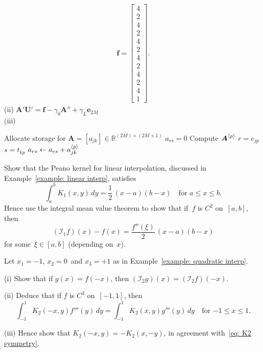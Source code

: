 \begin{Exercises}
\begin{ans}
\begin{gather*}
\boldsymbol{f}=\left[\begin{array}{c}
4\\ 2\\ 4\\ 2\\ 4\\ 2\\ 4\\ 2\\ 4\\ 2\\ 4\\ 1
\end{array}\right].
\end{gather*}
(ii) $\boldsymbol{A}'\boldsymbol{U}'=\boldsymbol{f}-\gamma_0\boldsymbol{A}''
+\gamma_L\boldsymbol{e}_{2M}$\\
(iii)
\begin{algorithmic}
\State Allocate storage for 
$\boldsymbol{A}=[a_{jk}]\in\mathbb{R}^{(2M)\times(2M+1)}$ 
        \State $a_{rs}=0$ 
    \EndFor
\EndFor
{}
    \State Compute $\boldsymbol{A}^{\langle p\rangle}$ 
        \State $r=e_{jp}$
                \State $s=t_{kp}$
                \State $a_{rs}\gets a_{rs}+a^{\langle p\rangle}_{jk}$
            \EndFor
        \EndIf
    \EndFor
\EndFor
\end{algorithmic}
\end{ans}

\exercise
Show that the Peano kernel for linear interpolation, discussed in 
Example~\ref{example: linear interp}, satisfies
\[
\int_a^b K_1(x,y)\,dy=\frac{1}{2}\,(x-a)(b-x)\quad\text{for $a\le x\le b$.}
\]
Hence use the integral mean value theorem to show that if~$f$ is $C^2$ 
on~$[a,b]$, then 
\[
(\mathcal{I}_1f)(x)-f(x)=\frac{f''(\xi)}{2}\,(x-a)(b-x)
\]
for some~$\xi\in[a,b]$ (depending on~$x$).

\exercise
Let $x_1=-1$, $x_2=0$~and $x_3=+1$ as in 
Example~\ref{example: quadratic interp}.  
\begin{description}
\item{(i)} Show that if $g(x)=f(-x)$, then 
$(\mathcal{I}_2g)(x)=(\mathcal{I}_2f)(-x)$.
\item{(ii)} Deduce that if $f$ is $C^3$ on~$[-1,1]$, then
\[
\int_{-1}^1K_2(-x,y)f'''(y)\,dy=\int_{-1}^1K_2(x,y)g'''(y)\,dy
	\quad\text{for $-1\le x\le 1$.}
\]
\item{(iii)} Hence show that $K_2(-x,y)=-K_2(x,-y)$, in agreement 
with~\eqref{eq: K2 symmetry}.
\end{description}


\end{Exercises}
